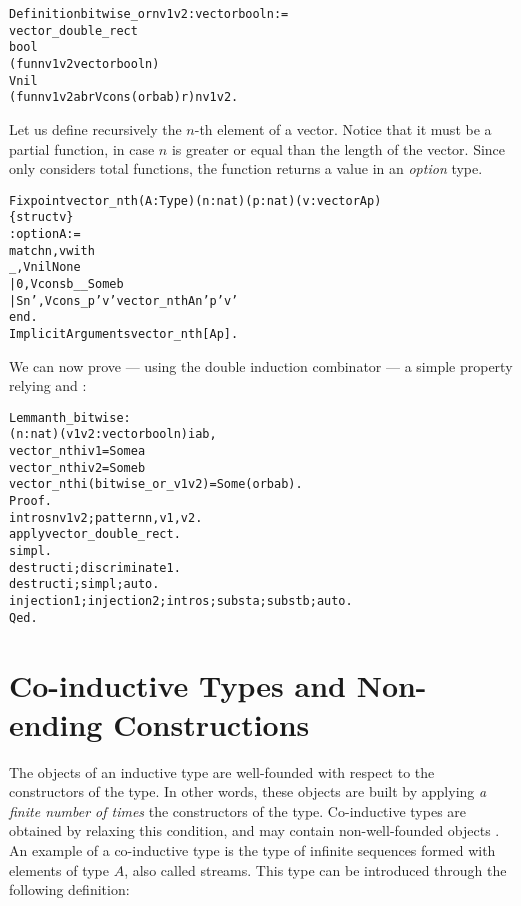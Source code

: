 \documentclass[11pt]{article}
\begin{document}
\begin{alltt}
Definition bitwise_or n v1 v2 : vector bool n :=
   vector_double_rect 
    bool 
    (fun n v1 v2 {\funarrow} vector bool n)
    Vnil
    (fun n v1 v2 a b r {\funarrow} Vcons (orb a b) r) n v1 v2.
\end{alltt}

Let us  define recursively the $n$-th element of a vector. Notice
that it must be a partial function, in case $n$ is greater or equal
than the length of the vector. Since {\coq} only considers total
functions, the function returns a value in an \emph{option} type.

\begin{alltt}
Fixpoint vector_nth (A:Type)(n:nat)(p:nat)(v:vector A p)
                  \{struct v\}
                  : option A :=
  match n,v  with
    _   , Vnil {\funarrow} None
  | 0   , Vcons b  _ _ {\funarrow} Some b
  | S n', Vcons _  p' v' {\funarrow} vector_nth A n'  p' v'
  end.
Implicit Arguments vector_nth [A p].
\end{alltt}

We can now prove --- using the double induction combinator ---
a simple property relying  and :

\begin{alltt}
Lemma nth_bitwise :
   {\prodsym} (n:nat) (v1 v2: vector bool n) i  a b,
      vector_nth i v1 = Some a {\arrow}
      vector_nth i v2 = Some b {\arrow}
      vector_nth i (bitwise_or _ v1 v2) = Some (orb a b).
Proof.
 intros  n v1 v2; pattern n,v1,v2.
 apply vector_double_rect.
 simpl.
 destruct i; discriminate 1.
 destruct i; simpl;auto.
 injection 1; injection 2;intros; subst a; subst b; auto.
Qed.
\end{alltt}


\section{Co-inductive Types and Non-ending Constructions}
\label{CoInduction}

The objects of an inductive type are well-founded with respect to
the constructors of the type. In other words, these objects are built
by applying \emph{a finite number of times} the constructors of the type.
Co-inductive types are obtained by relaxing this condition,
and may contain non-well-founded objects \cite{EG96,EG95a}.  An
example of a co-inductive type is the type of  infinite
sequences formed with elements of type $A$, also called streams.  This
type can be introduced through the following definition:
\end{document}
